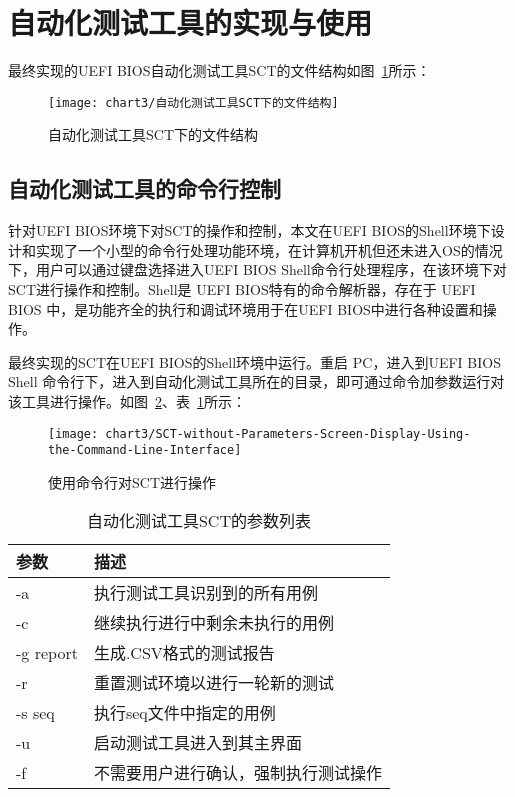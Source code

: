 \section{自动化测试工具的实现与使用}
	
	最终实现的UEFI BIOS自动化测试工具SCT的文件结构如图~\ref{fig:自动化测试工具SCT下的文件结构}所示：
	
	\begin{figure}[H] %
		\centering
		\texttt{[image: chart3/自动化测试工具SCT下的文件结构]}
		\caption{自动化测试工具SCT下的文件结构}
		\label{fig:自动化测试工具SCT下的文件结构}
	\end{figure}
	
	\subsection{自动化测试工具的命令行控制}
	
	针对UEFI BIOS环境下对SCT的操作和控制，本文在UEFI BIOS的Shell环境下设计和实现了一个小型的命令行处理功能环境，在计算机开机但还未进入OS的情况下，用户可以通过键盘选择进入UEFI BIOS Shell命令行处理程序，在该环境下对SCT进行操作和控制。Shell是 UEFI BIOS特有的命令解析器，存在于 UEFI BIOS 中，是功能齐全的执行和调试环境用于在UEFI BIOS中进行各种设置和操作。
	
	最终实现的SCT在UEFI BIOS的Shell环境中运行。重启 PC，进入到UEFI BIOS Shell 命令行下，进入到自动化测试工具所在的目录，即可通过命令加参数运行对该工具进行操作。如图~\ref{fig:SCT-without-Parameters-Screen-Display-Using-the-Command-Line-Interface}、表~\ref{tab:自动化测试工具SCT的参数列表}所示：
	
	\begin{figure}[H] %
		\centering
		\texttt{[image: chart3/SCT-without-Parameters-Screen-Display-Using-the-Command-Line-Interface]}
		\caption{使用命令行对SCT进行操作}
		\label{fig:SCT-without-Parameters-Screen-Display-Using-the-Command-Line-Interface}
	\end{figure}
	
	\begin{table}[H]
		\centering
		\caption{自动化测试工具SCT的参数列表}
		\label{tab:自动化测试工具SCT的参数列表}
		\begin{center}
		\begin{tabular}{|l|p{9cm}|} 
		\hline
		参数 & 描述 \\ \hline
		-a & 执行测试工具识别到的所有用例 \\ \hline
		-c & 继续执行进行中剩余未执行的用例 \\ \hline
		-g report & 生成.CSV格式的测试报告 \\ \hline
		-r & 重置测试环境以进行一轮新的测试  \\ \hline
		-s seq & 执行seq文件中指定的用例 \\ \hline
		-u & 启动测试工具进入到其主界面 \\ \hline
		-f & 不需要用户进行确认，强制执行测试操作 \\ \hline
		\end{tabular}
		\end{center}
	\end{table}
	
